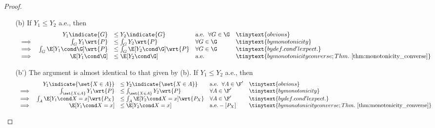 \documentclass{article} %
\begin{document}
\begin{proof}
\begin{itemize}
	\begin{enumerate}
		\item $g^{-1} (B) \in \F'$ for all $B \in \B(\overline{\R}))$? \greencheck.  By a similar argument as in (a), $\set{g^{-1} (B): B \in \B(\overline{\R})} = \set{\Omega', \emptyset}$.
		\item $\int_{\set{X \in A}} Y \wrt{P} =  \int_A g \wrt{P_X}$ for all $A \in \F'$? \greencheck.   By hypothesis on $Y$ and our guess on $g$, the condition to be verified becomes $\int_{\set{X \in A}} k \wrt{P} =  \int_A k \wrt{P_X}$.  By integrals of indicators, LHS gives $k P\set{X \in A}$ and the RHS gives $k P_X(A)$. Recalling that $P_X(A) \defeq \set{X \in A}$, the proof is complete.
	\end{enumerate} 
\item[(b)] If $Y_1 \leq Y_2$ a.e., then 
\[\begin{array}{rrlll}
& Y_1 \indicate{G} &\leq Y_2 \indicate{G} & \text{a.e. } \, \forall G \in \G  & \tinytext{obvious} \\
\implies & \int_G Y_1 \wrt{P} & \leq  \int_G Y_2 \wrt{P} & \forall G \in \G & \tinytext{by monotonicity} \\
\implies & \int_G \E[Y_1 \cond \G] \wrt{P} & \leq  \int_G \E[Y_2 \cond \G] \wrt{P} &  \forall G \in \G & \tinytext{by def. cond'l expect.} \\
\implies & \E[Y_1 \cond \G]  & \leq  \E[Y_2 \cond \G]  &  \text{a.e.}  & \tinytext{by monotonicity converse; Thm.~\ref{thm:monotonicity_converse}} \\
\end{array}
\]
\item[(b')] The argument is almost identical to that given by (b). If $Y_1 \leq Y_2$ a.e., then 
\[\begin{array}{rrlll}
& Y_1 \indicate{\set{X \in A}} &\leq Y_2 \indicate{\set{X \in A}}  & \text{a.e. } \, \forall A \in \F'  & \tinytext{obvious} \\
\implies & \int_{\set{X \in A}} Y_1 \wrt{P} & \leq  \int_{\set{X \in A}} Y_2 \wrt{P} & \forall A \in \F' & \tinytext{by monotonicity} \\
\implies & \int_A \E[Y_1 \cond X=x] \wrt{P_X} & \leq  \int_A \E[Y_2 \cond X=x] \wrt{P_X} &  \forall A \in \F' & \tinytext{by def. cond'l expect.} \\
\implies & \E[Y_1 \cond X=x]  & \leq  \E[Y_2 \cond X=x]  &  \text{a.e.}-[P_X]  & \tinytext{by monotonicity converse; Thm.~\ref{thm:monotonicity_converse}} \\
\end{array}
\]
\end{itemize}
\end{proof}
\end{document}
